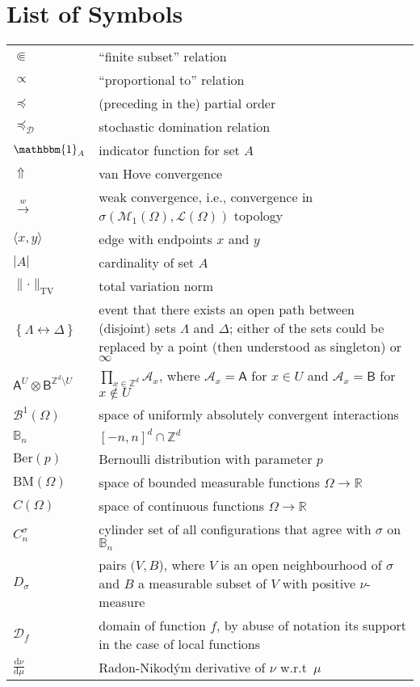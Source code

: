 \documentclass[12pt]{article}
\newcommand{\A}{\mathcal{A}}
\renewcommand{\AA}{\mathsf{A}}
\newcommand{\BB}{\mathscr{B}}
\newcommand{\BBB}{\mathbb{B}}
\newcommand{\AB}{\mathsf{B}}
\newcommand{\D}{\mathcal{D}}
\renewcommand{\d}{\mathrm{d}}
\newcommand{\Loc}{\mathcal{L}}
\newcommand{\M}{\mathcal{M}}
\newcommand{\R}{\mathbb{R}}
\newcommand{\Z}{\mathbb{Z}}
\newcommand{\BM}{\mathrm{BM}}
\newcommand{\TV}{\mathrm{TV}}
\newcommand{\set}[1]{\left\{#1\right\}}
\newcommand{\ra}{\rightarrow}
\newcommand{\pika}{\boldsymbol{\cdot}}
\newcommand{\1}{\mathbbm{1}}
\renewcommand{\sp}[1]{\langle #1\rangle}
\newcommand{\5}{\vspace{0.5cm}}
\theoremstyle{definition}
\begin{document}
\section*{List of Symbols}

\begin{tabular}{p{4cm}p{10cm}}
$\Subset$ & ``finite subset'' relation \\
$\propto$ & ``proportional to'' relation \\
$\preceq$ & (preceding in the) partial order \\
$\preceq_\D$ & stochastic domination relation \\
$\1_A$ & indicator function for set $A$ \\
$\Uparrow$ & van Hove convergence \\
$\xrightarrow{w}$ & weak convergence, i.e., convergence in $\sigma(\M_1(\Omega),\Loc(\Omega))$ topology \\
$\sp{x,y}$ & edge with endpoints $x$ and $y$ \\
$|A|$ & cardinality of set $A$ \\
$\|\!\pika\!\|_\TV$ & total variation norm \\
$\set{\Lambda\leftrightarrow\Delta}$ & event that there exists an open path between (disjoint) sets $\Lambda$ and $\Delta$; either of the sets could be replaced by a point (then understood as singleton) or $\infty$ \\
$\AA^U\otimes\AB^{\Z^d\setminus U}$ & $\prod_{x\in\Z^d}\A_x$, where $\A_x=\AA$ for $x\in U$ and $\A_x=\AB$ for $x\notin U$ \\
$\BB^1(\Omega)$ & space of uniformly absolutely convergent interactions \\
$\BBB_n$ & $[-n,n]^d\cap\Z^d$ \\
$\mathrm{Ber}(p)$ & Bernoulli distribution with parameter $p$ \\
$\BM(\Omega)$ & space of bounded measurable functions $\Omega\ra\R$ \\
$C(\Omega)$ & space of continuous functions $\Omega\ra\R$ \\
$C_n^\sigma$ & cylinder set of all configurations that agree with $\sigma$ on $\BBB_n$ \\
$D_\sigma$ & pairs $(V,B$), where $V$ is an open neighbourhood of $\sigma$ and $B$ a measurable subset of $V$ with positive $\nu$-measure \\
$\D_f$ & domain of function $f$, by abuse of notation its support in the case of local functions \\
$\frac{\d\nu}{\d\mu}$ & Radon-Nikod\'ym derivative of $\nu$ w.r.t~$\mu$ \\

\end{tabular}
\end{document}

